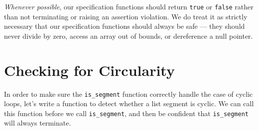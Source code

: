\emph{Whenever possible}, our specification functions should return
\lstinline'true' or \lstinline'false' rather than not terminating or
raising an assertion violation. We do treat it as strictly necessary
that our specification functions should always be safe --- they should
never divide by zero, access an array out of bounds, or dereference a
null pointer.

\newpage
\section{Checking for Circularity}
\label{sec:linkedlist:circularity}

In order to make sure the \lstinline'is_segment' function correctly
handle the case of cyclic loops, let's write a function to detect
whether a list segment is cyclic. We can call this function before we
call \lstinline'is_segment', and then be confident that
\lstinline'is_segment' will always terminate.

